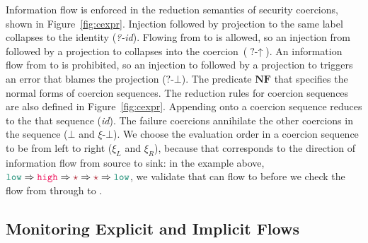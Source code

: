 Information flow is enforced in the reduction semantics of security coercions,
shown in Figure~\ref{fig:cexpr}. Injection followed by projection to the same
label collapses to the identity (\textit{?-id}). Flowing from \low to \high is
allowed, so an injection from \low followed by a projection to \high collapses
into the \up{} coercion~($\textit{?-}\uparrow$). An information flow from \high
to \low is prohibited, so an injection to \high followed by a projection to \low
triggers an error that blames the projection ($\textit{?-}\bot$). The predicate
$\mathbf{NF}$ that specifies the normal forms of coercion sequences. The
reduction rules for coercion sequences are also defined in
Figure~\ref{fig:cexpr}. Appending  onto a coercion sequence reduces to the
that sequence (\textit{id}). The failure coercions annihilate the other
coercions in the sequence ($\bot$ and $\xi\textit{-}\bot$). We choose the
evaluation order in a coercion sequence to be from left to right ($\xi_L$ and
$\xi_R$), because that corresponds to the direction of information flow from
source to sink: in the example above, $\low \Rightarrow \high \Rightarrow \unk
\Rightarrow \unk \Rightarrow \low$, we validate that \low can flow to \high
before we check the flow from \high through \unk to \low.

\subsection{Monitoring Explicit and Implicit Flows}
\label{sec:cexpr-comp-stamp}

